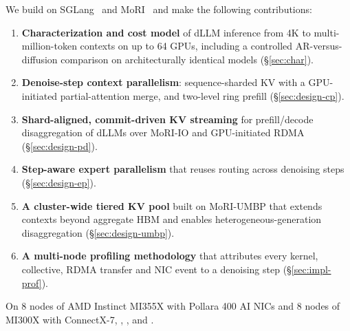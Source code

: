 We build \sys on SGLang~\cite{zheng2023sglang} and MoRI~\cite{mori} and make the following
contributions:
\begin{enumerate}
  \item \textbf{Characterization and cost model} of dLLM inference from 4K to multi-million-token
  contexts on up to 64 GPUs, including a controlled AR-versus-diffusion comparison on
  architecturally identical models (\S\ref{sec:char}).
  \item \textbf{Denoise-step context parallelism}: sequence-sharded KV with a GPU-initiated
  partial-attention merge, and two-level ring prefill (\S\ref{sec:design-cp}).
  \item \textbf{Shard-aligned, commit-driven KV streaming} for prefill/decode disaggregation of dLLMs
  over MoRI-IO and GPU-initiated RDMA (\S\ref{sec:design-pd}).
  \item \textbf{Step-aware expert parallelism} that reuses routing across denoising steps
  (\S\ref{sec:design-ep}).
  \item \textbf{A cluster-wide tiered KV pool} built on MoRI-UMBP that extends contexts beyond
  aggregate HBM and enables heterogeneous-generation disaggregation (\S\ref{sec:design-umbp}).
  \item \textbf{A multi-node profiling methodology} that attributes every kernel, collective, RDMA
  transfer and NIC event to a denoising step (\S\ref{sec:impl-prof}).
\end{enumerate}

On 8 nodes of AMD Instinct MI355X with Pollara 400 AI NICs and 8 nodes of MI300X with ConnectX-7,
\sys {}, , and .

